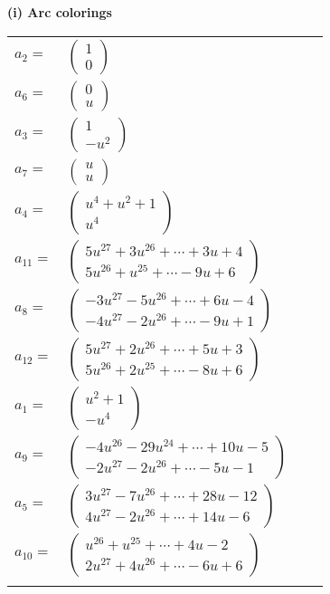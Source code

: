 \documentclass[1p]{elsarticle_modified}
\theoremstyle{definition}
\begin{document}
\flushleft \textbf{(i) Arc colorings}\\
\begin{tabular}{m{7pt} m{180pt} m{7pt} m{180pt} }
\flushright $a_{2}=$&$\begin{pmatrix}1\\0\end{pmatrix}$ \\
\flushright $a_{6}=$&$\begin{pmatrix}0\\u\end{pmatrix}$ \\
\flushright $a_{3}=$&$\begin{pmatrix}1\\- u^2\end{pmatrix}$ \\
\flushright $a_{7}=$&$\begin{pmatrix}u\\u\end{pmatrix}$ \\
\flushright $a_{4}=$&$\begin{pmatrix}u^4+u^2+1\\u^4\end{pmatrix}$ \\
\flushright $a_{11}=$&$\begin{pmatrix}5 u^{27}+3 u^{26}+\cdots+3 u+4\\5 u^{26}+u^{25}+\cdots-9 u+6\end{pmatrix}$ \\
\flushright $a_{8}=$&$\begin{pmatrix}-3 u^{27}-5 u^{26}+\cdots+6 u-4\\-4 u^{27}-2 u^{26}+\cdots-9 u+1\end{pmatrix}$ \\
\flushright $a_{12}=$&$\begin{pmatrix}5 u^{27}+2 u^{26}+\cdots+5 u+3\\5 u^{26}+2 u^{25}+\cdots-8 u+6\end{pmatrix}$ \\
\flushright $a_{1}=$&$\begin{pmatrix}u^2+1\\- u^4\end{pmatrix}$ \\
\flushright $a_{9}=$&$\begin{pmatrix}-4 u^{26}-29 u^{24}+\cdots+10 u-5\\-2 u^{27}-2 u^{26}+\cdots-5 u-1\end{pmatrix}$ \\
\flushright $a_{5}=$&$\begin{pmatrix}3 u^{27}-7 u^{26}+\cdots+28 u-12\\4 u^{27}-2 u^{26}+\cdots+14 u-6\end{pmatrix}$ \\
\flushright $a_{10}=$&$\begin{pmatrix}u^{26}+u^{25}+\cdots+4 u-2\\2 u^{27}+4 u^{26}+\cdots-6 u+6\end{pmatrix}$\\&\end{tabular}
\end{document}
